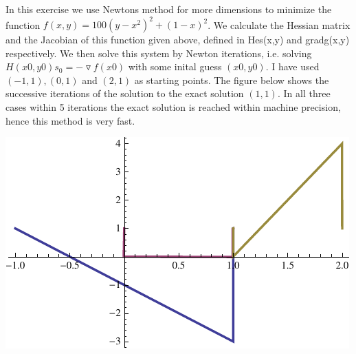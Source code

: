 \documentclass[10pt,a4paper]{article}
\begin{document}
\noindent In this exercise we use Newtons method for more dimensions to minimize the function $f(x,y) = 100(y-x^2)^2 + (1-x)^2$. We calculate the Hessian matrix and the Jacobian of this function given above, defined in Hes(x,y) and gradg(x,y) respectively. We then solve this system by Newton iterations, i.e. solving $H(x0,y0) s_{0} = - \triangledown f(x0)$ with some inital guess $(x0,y0)$. I have used $(-1,1),(0,1)$ and $(2,1)$ as starting points. The figure below shows the successive iterations of the solution to the exact solution $(1,1)$. In all three cases within 5 iterations the exact solution is reached within machine precision, hence this method is very fast.\\
\begin{center}
\includegraphics{plot2.pdf}
\end{center}
\end{document}

